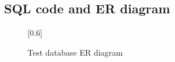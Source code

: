 \begin{appendices}
\section*{SQL code and ER diagram}

\newpage
\begin{sidewaysfigure}
  \centering
  \scalebox{0.6}[0.6]{}
  \caption{Test database ER diagram}
  \label{fig:databaseer}
\end{sidewaysfigure}

\end{appendices}